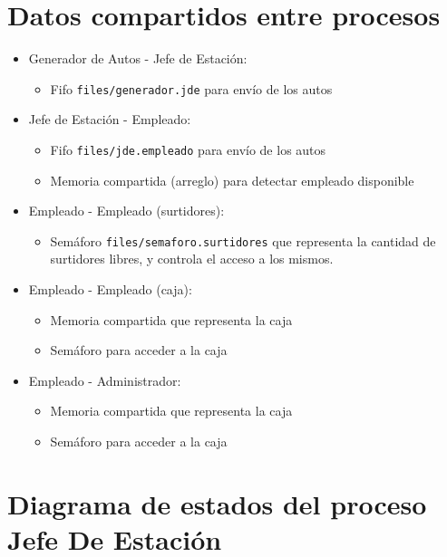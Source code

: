 \documentclass[12pt,a4paper,spanish]{article}
\begin{document}
	\section{Datos compartidos entre procesos}
	
	\begin{itemize}
	
	\item Generador de Autos - Jefe de Estación:
		\begin{itemize}
			\item Fifo \texttt{files/generador.jde} para envío de los autos
		\end{itemize}
	
	\item Jefe de Estación - Empleado:
	\begin{itemize}
		\item Fifo \texttt{files/jde.empleado} para envío de los autos
		\item Memoria compartida (arreglo) para detectar empleado disponible
	\end{itemize}
	
\item Empleado - Empleado (surtidores):
	\begin{itemize}
		\item Semáforo \texttt{files/semaforo.surtidores} que representa la 
		cantidad de surtidores libres, y controla el acceso a los mismos.
	\end{itemize}

	\item Empleado - Empleado (caja):
	\begin{itemize}
		\item Memoria compartida que representa la caja
		\item Semáforo \texttt{} para acceder a la caja
	\end{itemize}

	\item Empleado - Administrador:
	\begin{itemize}
		\item Memoria compartida que representa la caja
		\item Semáforo \texttt{} para acceder a la caja
	\end{itemize}

	\end{itemize}

	\section{Diagrama de estados del proceso Jefe De Estación}
\end{document}
